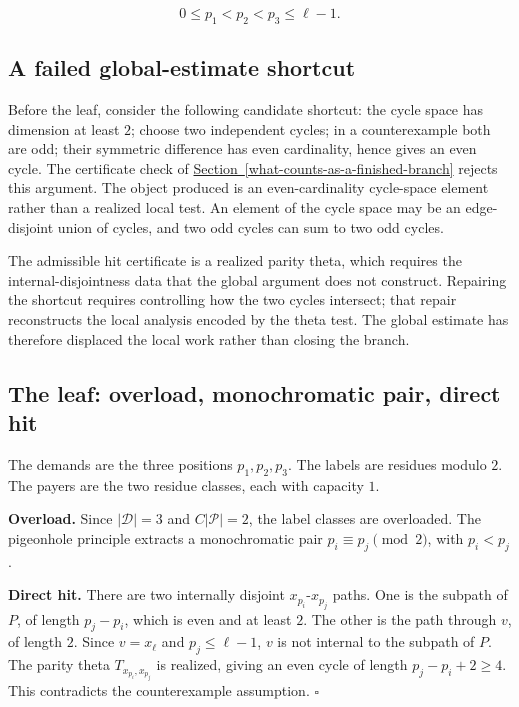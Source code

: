 \documentclass[
  11pt,
]{article}
\theoremstyle{definition}
\newcommand{\secref}[1]{\hyperref[#1]{Section~\ref*{#1}}}
\begin{document}
\[
0\le p_1<p_2<p_3\le \ell-1.
\]

\subsection{A failed global-estimate
shortcut}\label{c.5-a-failed-global-estimate-shortcut}

Before the leaf, consider the following candidate shortcut: the cycle
space has dimension at least \(2\); choose two independent cycles; in a
counterexample both are odd; their symmetric difference has even
cardinality, hence gives an even cycle. The certificate check of \secref{what-counts-as-a-finished-branch} rejects this argument. The object produced is an even-cardinality
cycle-space element rather than a realized local test. An element of
the cycle space may be an edge-disjoint union of cycles, and two odd
cycles can sum to two odd cycles.

The admissible hit certificate is a realized parity theta, which
requires the internal-disjointness data that the global argument does
not construct. Repairing the shortcut requires controlling how the two
cycles intersect; that repair reconstructs the local analysis encoded by
the theta test. The global estimate has therefore displaced the local
work rather than closing the branch.

\subsection{The leaf: overload, monochromatic pair, direct
hit}\label{c.6-the-leaf-overload-monochromatic-pair-direct-hit}

The demands are the three positions \(p_1,p_2,p_3\). The labels are
residues modulo \(2\). The payers are the two residue classes, each with
capacity \(1\).

\textbf{Overload.} Since \(|\mathcal D|=3\) and \(C|\mathcal P|=2\), the
label classes are overloaded. The pigeonhole principle extracts a
monochromatic pair \(p_i\equiv p_j\pmod 2\), with \(p_i<p_j\).

\textbf{Direct hit.} There are two internally disjoint
\(x_{p_i}\)-\(x_{p_j}\) paths. One is the subpath of \(P\), of length
\(p_j-p_i\), which is even and at least \(2\). The other is the path
through \(v\), of length \(2\). Since \(v=x_\ell\) and
\(p_j\le \ell-1\), \(v\) is not internal to the subpath of \(P\). The
parity theta \(T_{x_{p_i},x_{p_j}}\) is realized, giving an even cycle
of length \(p_j-p_i+2\ge4\). This contradicts the counterexample
assumption. \(\square\)
\end{document}
